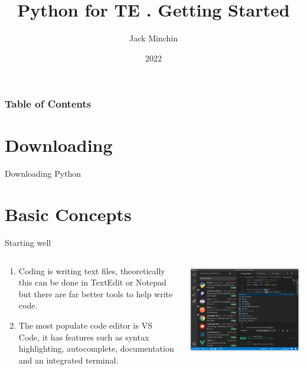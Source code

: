 \documentclass[aspectratio=169]{beamer}
\title{\large{\textbf{Python for TE}} \newline\newline 2. Getting Started}
\author{Jack Minchin}
\institute{Tourism Economics}
\date{2022}
\begin{document}
\frame{\titlepage}

\begin{frame}
\frametitle{Table of Contents}
\tableofcontents
\end{frame}

\section{Downloading}
\begin{frame}{Downloading Python}
	
\end{frame}



\section{Basic Concepts}

\begin{frame}{Starting well}
\begin{columns}

\begin{column}{0.4\textwidth}
\begin{enumerate}
  \item Coding is writing text files, theoretically this can be done in TextEdit or Notepad but there are far better tools to help write code. 
	
	\item The most populate code editor is VS Code, it has features such as syntax highlighting, autocomplete, documentation and an integrated terminal. 
\end{enumerate}

\end{column}

\begin{column}{0.6\textwidth}
\includegraphics[width=0.9\linewidth]{graphics/home-screenshot-mac.png}	
\end{column}


\end{columns}


	
	
		
\end{frame}
\end{document}

